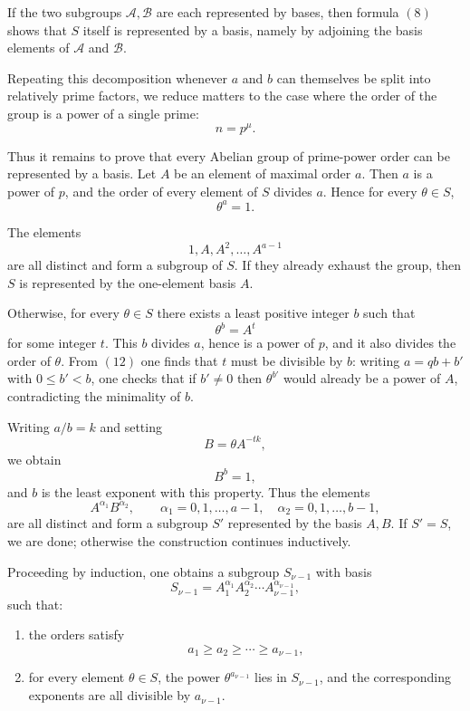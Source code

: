 \documentclass[11pt]{article}
\begin{document}
If the two subgroups \(\mathcal A,\mathcal B\) are each represented by bases, then formula \((8)\) shows that \(S\) itself is represented by a basis, namely by adjoining the basis elements of \(\mathcal A\) and \(\mathcal B\).

Repeating this decomposition whenever \(a\) and \(b\) can themselves be split into relatively prime factors, we reduce matters to the case where the order of the group is a power of a single prime:
\[
n=p^\mu.
\tag{9}
\]

Thus it remains to prove that every Abelian group of prime-power order can be represented by a basis. Let \(A\) be an element of maximal order \(a\). Then \(a\) is a power of \(p\), and the order of every element of \(S\) divides \(a\). Hence for every \(\theta\in S\),
\[
\theta^a=1.
\tag{10}
\]

The elements
\[
1,A,A^2,\dots,A^{a-1}
\tag{11}
\]
are all distinct and form a subgroup of \(S\). If they already exhaust the group, then \(S\) is represented by the one-element basis \(A\).

Otherwise, for every \(\theta\in S\) there exists a least positive integer \(b\) such that
\[
\theta^b=A^t
\tag{12}
\]
for some integer \(t\). This \(b\) divides \(a\), hence is a power of \(p\), and it also divides the order of \(\theta\). From \((12)\) one finds that \(t\) must be divisible by \(b\): writing \(a=qb+b'\) with \(0\leq b'<b\), one checks that if \(b'\neq 0\) then \(\theta^{b'}\) would already be a power of \(A\), contradicting the minimality of \(b\).

Writing \(a/b=k\) and setting
\[
B=\theta A^{-tk},
\tag{13}
\]
we obtain
\[
B^b=1,
\tag{14}
\]
and \(b\) is the least exponent with this property. Thus the elements
\[
A^{\alpha_1}B^{\alpha_2},
\qquad
\alpha_1=0,1,\dots,a-1,\quad
\alpha_2=0,1,\dots,b-1,
\tag{15}
\]
are all distinct and form a subgroup \(S'\) represented by the basis \(A,B\). If \(S'=S\), we are done; otherwise the construction continues inductively.

Proceeding by induction, one obtains a subgroup \(S_{\nu-1}\) with basis
\[
S_{\nu-1}=A_1^{\alpha_1}A_2^{\alpha_2}\cdots A_{\nu-1}^{\alpha_{\nu-1}},
\tag{16}
\]
such that:
\begin{enumerate}
\item the orders satisfy
\[
a_1\geq a_2\geq \cdots\geq a_{\nu-1},
\]
\item for every element \(\theta\in S\), the power \(\theta^{a_{\nu-1}}\) lies in \(S_{\nu-1}\), and the corresponding exponents are all divisible by \(a_{\nu-1}\).
\end{enumerate}
\end{document}
